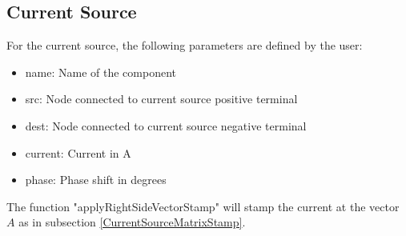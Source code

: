 \subsection{Current Source}

For the current source, the following parameters are defined by the user:

\begin{itemize}
\item name: Name of the component
\item src: Node connected to current source positive terminal
\item dest: Node connected to current source negative terminal
\item current: Current in A
\item phase: Phase shift in degrees
\end{itemize}

The function "applyRightSideVectorStamp" will stamp the current at the vector $A$ as in subsection \ref{CurrentSourceMatrixStamp}.